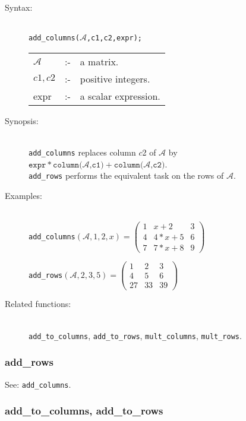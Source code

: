 \begin{description}
\item[Syntax:]\mbox{}\\
\texttt{add\_columns($\mathcal{A}$,c1,c2,expr);}

\begin{tabular}{l l l}
$\mathcal{A}$ & :- & a matrix. \\
$c1,c2$      & :- & positive integers. \\
expr       & :- & a scalar expression.
\end{tabular}

\item[Synopsis:]\mbox{}\\
\texttt{add\_columns} replaces column $c$2 of $\mathcal{A}$ by\\
$\texttt{expr} * \texttt{column($\mathcal{A}$,c1)} + \texttt{column($\mathcal{A}$,c2)}$.\\
\texttt{add\_rows} performs the equivalent task on the rows of $\mathcal{A}$.

\item[Examples:]\mbox{}\\
  \texttt{add\_columns}\((\mathcal{A},1,2,x)  =
  \begin{pmatrix} 1 & x+2 & 3 \\ 4 & 4*x+5 & 6 \\ 7 & 7*x+8 & 9 \end{pmatrix}\)

  \texttt{add\_rows}\((\mathcal{A},2,3,5)  =
  \begin{pmatrix} 1 & 2 & 3 \\ 4 & 5 & 6 \\ 27 & 33 & 39 \end{pmatrix}\)

\item[Related functions:]\mbox{}\\
\texttt{add\_to\_columns}, \texttt{add\_to\_rows},
\texttt{mult\_columns}, \texttt{mult\_rows}.
\end{description}

\subsubsection{add\_rows}
\label{linalg:add_rows}

See: \texttt{add\_columns}.


\subsubsection{add\_to\_columns, add\_to\_rows}
\label{linalg:add_to_columns}

